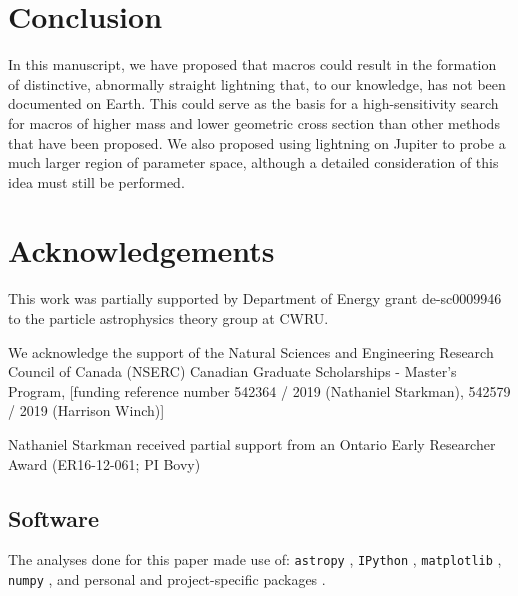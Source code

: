 \documentclass[%
 reprint,
 amsmath,amssymb,
 aps,
]{revtex4-2}
\begin{document}

\medskip
\section{Conclusion} %
\label{sec:conclusion}

    In this manuscript, we have proposed that macros could result in the formation of distinctive, abnormally straight lightning that, to our knowledge, has not been documented on Earth. This could serve as the basis for a high-sensitivity search for macros of higher mass and lower geometric cross section than other methods that have been proposed. We also proposed using lightning on Jupiter to probe a much larger region of parameter space, although a detailed consideration of this idea must still be performed.



\section{Acknowledgements} %
\label{sec:acknowledgements}

    This work was partially supported by Department of Energy grant de-sc0009946 to the particle astrophysics theory group at CWRU.

    We acknowledge the support of the Natural Sciences and Engineering Research Council of Canada (NSERC) Canadian Graduate Scholarships - Master's Program, [funding reference number 542364 / 2019 (Nathaniel Starkman), 542579 / 2019 (Harrison Winch)]
    
    Nathaniel Starkman received partial support from an Ontario Early Researcher Award (ER16-12-061; PI Bovy)

    \subsection*{Software} %
    \label{sub:software_citation}

         The analyses done for this paper made use of: \texttt{astropy} \cite{code_Astropy2013, code_Astropy2018}, \texttt{IPython} \cite{code_Perez2007}, \texttt{matplotlib} \cite{code_Hunter2007}, \texttt{numpy} \cite{code_Walt2011}, and personal and project-specific packages \cite{code_utilipy2020, code_starkplot2020, code_macrolightning2020}.
\end{document}
